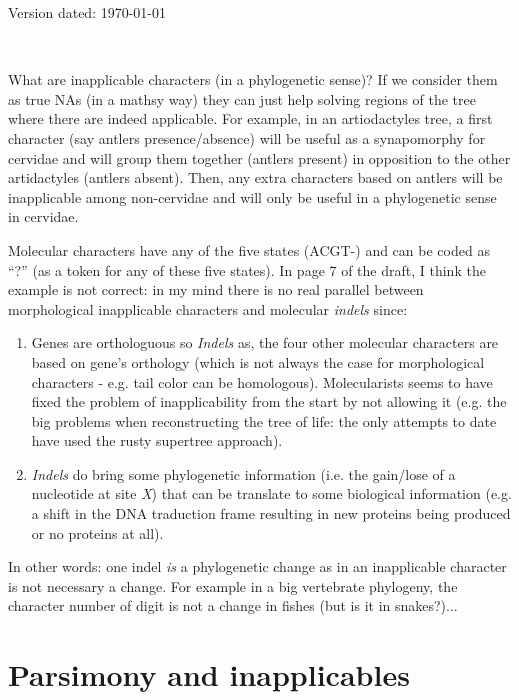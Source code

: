 \documentclass[a4paper,11pt]{article}
\begin{document}
\begin{flushright}
Version dated: \today
\end{flushright}
\begin{center}

\\
\bigskip
\end{center}

What are inapplicable characters (in a phylogenetic sense)?
If we consider them as true NAs (in a mathsy way) they can just help solving regions of the tree where there are indeed applicable.
For example, in an artiodactyles tree, a first character (say antlers presence/absence) will be useful as a synapomorphy for cervidae and will group them together (antlers present) in opposition to the other artidactyles (antlers absent).
Then, any extra characters based on antlers will be inapplicable among non-cervidae and will only be useful in a phylogenetic sense in cervidae.

Molecular characters have any of the five states (ACGT-) and can be coded as ``?'' (as a token for any of these five states).
In page 7 of the draft, I think the example is not correct: in my mind there is no real parallel between morphological inapplicable characters and molecular \textit{indels} since:
\begin{enumerate}
\item Genes are orthologuous so \textit{Indels} as, the four other molecular characters are based on gene's orthology (which is not always the case for morphological characters - e.g. tail color can be homologous). Molecularists seems to have fixed the problem of inapplicability from the start by not allowing it (e.g. the big problems when reconstructing the tree of life: the only attempts to date have used the rusty supertree approach).
\item \textit{Indels} do bring some phylogenetic information (i.e. the gain/lose of a nucleotide at site \textit{X}) that can be translate to some biological information (e.g. a shift in the DNA traduction frame resulting in new proteins being produced or no proteins at all).
\end{enumerate}
In other words: one indel \textit{is} a phylogenetic change as in an inapplicable character is not necessary a change.
For example in a big vertebrate phylogeny, the character number of digit is not a change in fishes (but is it in snakes?)...

\section{Parsimony and inapplicables}
\end{document}
